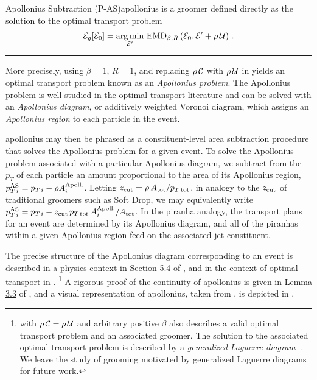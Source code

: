 \begin{definitionbox}{Apollonius Subtraction (P-AS)}{apollonius}
     is a \PIRANHA{} groomer defined directly as the solution to the optimal transport problem
\begin{align}
    \label{eq:apollonius-definition}
    \mathcal{E}_g[\mathcal E_0] = \underset{\mathcal{E}'}{\arg \min}\ {\rm EMD}_{\beta, R}
    \left(\mathcal{E}_0, \mathcal{E}' + \rhoU\right)
    \,.
\end{align}

    \vspace{7pt}
    \hrule
    \vspace{7pt}

    More precisely, using \(\beta = 1\), \(R =1\), and replacing \(\rho\,\mathcal{C}\) with \(\rho\,\mathcal{U}\) in  yields an optimal transport problem known as an \textit{Apollonius problem}.
    The Apollonius problem is well studied in the optimal transport literature and can be solved with an \textit{Apollonius diagram}, or additively weighted Voronoi diagram, which assigns an \textit{Apollonius region} to each particle in the event.

    \gls{apollonius} may then be phrased as a constituent-level area subtraction procedure that solves the Apollonius problem for a given event.
    To solve the Apollonius problem associated with a particular Apollonius diagram, we subtract from the \(p_T\) of each particle an amount proportional to the area of its Apollonius region,
    \(p_{T\,i}^{\rm AS} = p_{T\,i} - \rho A_i^{\rm Apoll.}\).
    Letting \(z_{\rm cut} = \rho \, A_{\rm tot} / p_{T\,{\rm tot}}\), in analogy to the \(z_{\rm cut}\) of traditional groomers such as Soft Drop, we may equivalently write
    \(p_{T\,i}^{\rm AS} = p_{T\,i} - z_{\rm cut}\,p_{T\,{\rm tot}}\,A_i^{\rm Apoll.} / A_{\rm tot}\).
    In the piranha analogy, the transport plans for an event are determined by its Apollonius diagram, and all of the piranhas within a given Apollonius region feed on the associated jet constituent.
\end{definitionbox}

The precise structure of the Apollonius diagram corresponding to an event is described in a physics context in Section 5.4 of , and in the context of optimal transport in .%
\footnote{
     with \(\rho\,\mathcal{C} = \rho\,\mathcal{U}\) and arbitrary positive \(\beta\) also describes a valid optimal transport problem and an associated \PIRANHA{} groomer.
    The solution to the associated optimal transport problem is described by a \textit{generalized Laguerre diagram}~\cite{Komiske:2020qhg, bourne2018semidiscrete}.
    We leave the study of \PIRANHA{} grooming motivated by generalized Laguerre diagrams for future work.
}
%
A rigorous proof of the continuity of \gls{apollonius} is given in \href{https://arxiv.org/pdf/1706.07403.pdf#page=15&zoom=100,0,200}{Lemma 3.3} of , and a visual representation of \gls{apollonius}, taken from , is depicted in .

